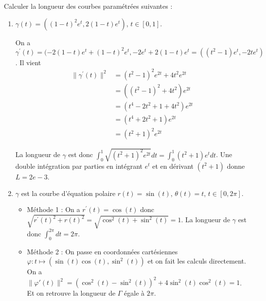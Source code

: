 \documentclass[a4paper]{article}
\begin{document}
 Calculer la longueur des courbes param\'etr\'ees suivantes :
\begin{enumerate}
\item $\gamma(t)=((1-t)^2e^t,2(1-t)e^t)$, $t\in [0,1]$.

		\medskip

On a  $\gamma^\prime(t)= (-2(1-t)e^t+(1-t)^2e^t,-2e^t+2(1-t)e^t=((t^2-1)e^t,-2te^t)$. Il vient
\begin{align*}
	\|\gamma^\prime(t)\|^2 &= (t^2-1)^2e^{2t}+4t^2e^{2t}\\
	&= ((t^2-1)^2+4t^2)e^{2t}\\
	&= (t^4-2t^2+1+4t^2)e^{2t}\\
	&= (t^4+2t^2+1)e^{2t}\\
	&= (t^2+1)^2e^{2t}
\end{align*}

La longueur de $\gamma$ est donc $\int_0^1 \sqrt{(t^2+1)^2e^{2t}}dt=\int_0^1 (t^2+1)e^tdt$. Une double int\'egration par parties en int\'egrant $e^t$ et en d\'erivant $(t^2+1)$ donne $L=2e-3$.
	\medskip
\item $\gamma$ est la courbe d'\'equation polaire $r(t)=\sin(t)$, $\theta(t)=t$, $t \in [0,2\pi]$.
	\medskip
	\begin{itemize}
		\item Méthode 1 : On a $r^\prime(t)=\cos(t)$ donc $\sqrt{r^\prime(t)^2+r(t)^2}=\sqrt{\cos^2(t)+\sin^2(t)}=1$. La longueur de $\gamma$ est donc $\int_0^{2\pi}dt=2\pi$.
		\item Méthode 2 : On passe en coordonnées cartésiennes $\varphi : t \mapsto (\sin(t) \cos(t),\sin^2(t))$ et on fait les calculs directement. On a $\|\varphi'(t)\|^2 = ( \cos^2(t)-\sin^2(t))^2 + 4 \sin^2(t) \cos^2(t) = 1$. Et on retrouve la longueur de $\Gamma$ égale à $2\pi$. 
	\end{itemize}



\end{enumerate}

\bigskip
\end{document}
